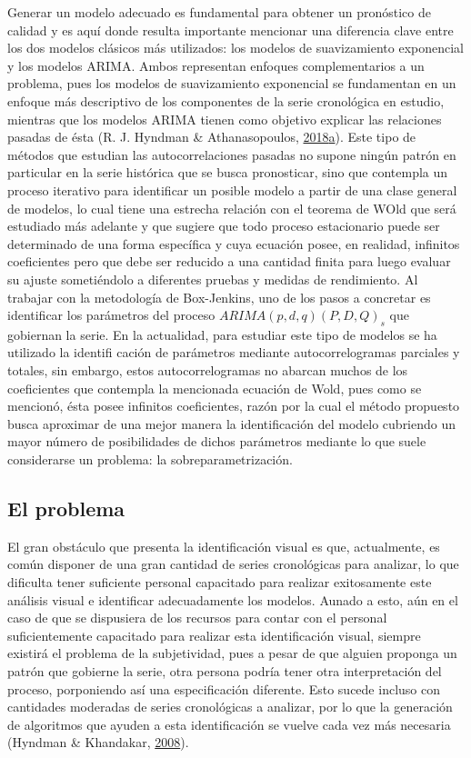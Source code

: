 \documentclass[
]{article}
\begin{document}
Generar un modelo adecuado es fundamental para obtener un pronóstico de
calidad y es aquí donde resulta importante mencionar una diferencia
clave entre los dos modelos clásicos más utilizados: los modelos de
suavizamiento exponencial y los modelos ARIMA. Ambos representan
enfoques complementarios a un problema, pues los modelos de
suavizamiento exponencial se fundamentan en un enfoque más descriptivo
de los componentes de la serie cronológica en estudio, mientras que los
modelos ARIMA tienen como objetivo explicar las relaciones pasadas de
ésta (R. J. Hyndman \& Athanasopoulos,
\protect\hyperlink{ref-hyndman2018forecasting}{2018}\protect\hyperlink{ref-hyndman2018forecasting}{a}).
Este tipo de métodos que estudian las autocorrelaciones pasadas no
supone ningún patrón en particular en la serie histórica que se busca
pronosticar, sino que contempla un proceso iterativo para identificar un
posible modelo a partir de una clase general de modelos, lo cual tiene
una estrecha relación con el teorema de WOld que será estudiado más
adelante y que sugiere que todo proceso estacionario puede ser
determinado de una forma específica y cuya ecuación posee, en realidad,
infinitos coeficientes pero que debe ser reducido a una cantidad finita
para luego evaluar su ajuste sometiéndolo a diferentes pruebas y medidas
de rendimiento. Al trabajar con la metodología de Box-Jenkins, uno de
los pasos a concretar es identificar los parámetros del proceso
\(ARIMA(p,d,q)(P,D,Q)_s\) que gobiernan la serie. En la actualidad, para
estudiar este tipo de modelos se ha utilizado la identifi cación de
parámetros mediante autocorrelogramas parciales y totales, sin embargo,
estos autocorrelogramas no abarcan muchos de los coeficientes que
contempla la mencionada ecuación de Wold, pues como se mencionó, ésta
posee infinitos coeficientes, razón por la cual el método propuesto
busca aproximar de una mejor manera la identificación del modelo
cubriendo un mayor número de posibilidades de dichos parámetros mediante
lo que suele considerarse un problema: la sobreparametrización.

\subsection{El problema}

El gran obstáculo que presenta la identificación visual es que,
actualmente, es común disponer de una gran cantidad de series
cronológicas para analizar, lo que dificulta tener suficiente personal
capacitado para realizar exitosamente este análisis visual e identificar
adecuadamente los modelos. Aunado a esto, aún en el caso de que se
dispusiera de los recursos para contar con el personal suficientemente
capacitado para realizar esta identificación visual, siempre existirá el
problema de la subjetividad, pues a pesar de que alguien proponga un
patrón que gobierne la serie, otra persona podría tener otra
interpretación del proceso, porponiendo así una especificación
diferente. Esto sucede incluso con cantidades moderadas de series
cronológicas a analizar, por lo que la generación de algoritmos que
ayuden a esta identificación se vuelve cada vez más necesaria (Hyndman
\& Khandakar, \protect\hyperlink{ref-auto.arima}{2008}).
\end{document}
